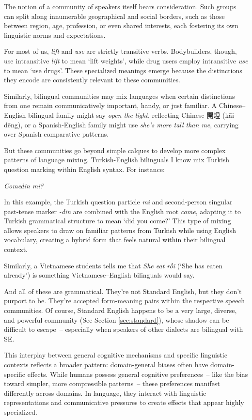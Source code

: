 The notion of a community of speakers itself bears consideration. Such groups can split along innumerable geographical and social borders, such as those between region, age, profession, or even shared interests, each fostering its own linguistic norms and expectations.

For most of us, \textit{lift} and \textit{use} are strictly transitive verbs. Bodybuilders, though, use intransitive \textit{lift} to mean `lift weights', while drug users employ intransitive \textit{use} to mean `use drugs'. These specialized meanings emerge because the distinctions they encode are consistently relevant to these communities. 

Similarly, bilingual communities may mix languages when certain distinctions from one remain communicatively important, handy, or just familiar. A Chinese--English bilingual family might say \textit{open the light}, reflecting Chinese 開燈 (kāi dēng), or a Spanish-English family might use \textit{she's more tall than me}, carrying over Spanish comparative patterns.

But these communities go beyond simple calques to develop more complex patterns of language mixing. Turkish-English bilinguals I know mix Turkish question marking within English syntax. For instance:

\ea \textit{Comedin mi?} \z

In this example, the Turkish question particle \textit{mi} and second-person singular past-tense marker \textit{-din} are combined with the English root \textit{come}, adapting it to Turkish grammatical structure to mean `did you come?' This type of mixing allows speakers to draw on familiar patterns from Turkish while using English vocabulary, creating a hybrid form that feels natural within their bilingual context.

Similarly, a Vietnamese students tells me that \textit{She eat rồi} (`She has eaten already') is something Vietnamese--English bilinguals would say.

And all of these are grammatical. They're not Standard English, but they don't purport to be. They're accepted form-meaning pairs within the respective speech communities. Of course, Standard English happens to be a very large, diverse, and powerful community (See Section \ref{sec:standard}), whose shadow can be difficult to escape~-- especially when speakers of other dialects are bilingual with SE.

This interplay between general cognitive mechanisms and specific linguistic contexts reflects a broader pattern: domain-general biases often have domain-specific effects. While humans possess general cognitive preferences~-- like the bias toward simpler, more compressible patterns~-- these preferences manifest differently across domains. In language, they interact with linguistic representations and communicative pressures to create effects that appear highly specialized.

